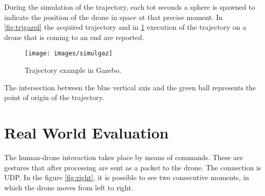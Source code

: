 \noindent During the simulation of the trajectory, each tot seconds a sphere is spawned to indicate the position of the drone in space at that precise moment. In \ref{fig:trjgazpl} the acquired trajectory and in \ref{fig:trjexgaz} execution of the trajectory on a drone that is coming to an end are reported.

\begin{figure}[H]
	\centering
	\texttt{[image: images/simulgaz]}
	\caption[Trajectory example in Gazebo.]{Trajectory example in Gazebo.}
	\label{fig:trjexgaz}
\end{figure}

\noindent The intersection between the blue vertical axis and the green ball represents the point of origin of the trajectory.

\section{Real World Evaluation}
\label{sec:drcontr}

The human-drone interaction takes place by means of commands. These are gestures that after processing are sent as a packet to the drone. The connection is UDP. In the figure \ref{fig:right}, it is possible to see two consecutive moments, in which the drone moves from left to right.

